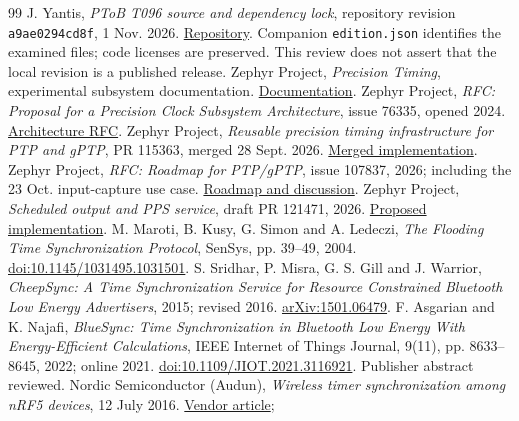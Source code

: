 \documentclass[10pt,letterpaper]{article}
\newcommand{\src}[1]{\nolinkurl{#1}}
\newcommand{\pin}{\texttt{a9ae0294cd8f}}
\begin{document}
\newpage
\begingroup
\fontsize{9}{10.6}\selectfont
\setlength{\parskip}{1pt}
\begin{thebibliography}{99}
\setlength{\itemsep}{3pt}
 J. Yantis, \emph{PToB T096 source and dependency lock}, repository revision \pin, 1 Nov. 2026. \href{https://github.com/yantisj2/PToB}{Repository}. Companion \src{edition.json} identifies the examined files; code licenses are preserved. This review does not assert that the local revision is a published release.
 Zephyr Project, \emph{Precision Timing}, experimental subsystem documentation. \href{https://docs.zephyrproject.org/latest/kernel/precision_timing.html}{Documentation}.
 Zephyr Project, \emph{RFC: Proposal for a Precision Clock Subsystem Architecture}, issue 76335, opened 2024. \href{https://github.com/zephyrproject-rtos/zephyr/issues/76335}{Architecture RFC}.
 Zephyr Project, \emph{Reusable precision timing infrastructure for PTP and gPTP}, PR 115363, merged 28 Sept. 2026. \href{https://github.com/zephyrproject-rtos/zephyr/pull/115363}{Merged implementation}.
 Zephyr Project, \emph{RFC: Roadmap for PTP/gPTP}, issue 107837, 2026; including the 23 Oct. input-capture use case. \href{https://github.com/zephyrproject-rtos/zephyr/issues/107837}{Roadmap and discussion}.
 Zephyr Project, \emph{Scheduled output and PPS service}, draft PR 121471, 2026. \href{https://github.com/zephyrproject-rtos/zephyr/pull/121471}{Proposed implementation}.
 M. Maroti, B. Kusy, G. Simon and A. Ledeczi, \emph{The Flooding Time Synchronization Protocol}, SenSys, pp. 39--49, 2004. \href{https://doi.org/10.1145/1031495.1031501}{doi:10.1145/1031495.1031501}.
 S. Sridhar, P. Misra, G. S. Gill and J. Warrior, \emph{CheepSync: A Time Synchronization Service for Resource Constrained Bluetooth Low Energy Advertisers}, 2015; revised 2016. \href{https://arxiv.org/abs/1501.06479}{arXiv:1501.06479}.
 F. Asgarian and K. Najafi, \emph{BlueSync: Time Synchronization in Bluetooth Low Energy With Energy-Efficient Calculations}, IEEE Internet of Things Journal, 9(11), pp. 8633--8645, 2022; online 2021. \href{https://doi.org/10.1109/JIOT.2021.3116921}{doi:10.1109/JIOT.2021.3116921}. Publisher abstract reviewed.
 Nordic Semiconductor (Audun), \emph{Wireless timer synchronization among nRF5 devices}, 12 July 2016. \href{https://devzone.nordicsemi.com/guides/short-range-guides/b/bluetooth-low-energy/posts/wireless-timer-synchronization-among-nrf5-devices}{Vendor article};

\end{thebibliography}
\end{document}
